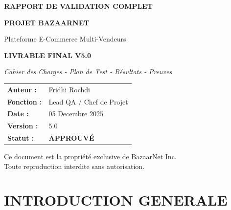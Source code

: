 \documentclass[12pt,a4paper]{article}
\begin{document}

\begin{titlepage}
    \begin{center}
        \vspace*{2cm}
        \Huge
        \textbf{RAPPORT DE VALIDATION COMPLET}
        
        \vspace{1cm}
        \LARGE
        \textbf{PROJET BAZAARNET}
        
        \vspace{0.5cm}
        \Large
        Plateforme E-Commerce Multi-Vendeurs
        
        \vspace{3cm}
        \textbf{LIVRABLE FINAL V5.0}
        
        \vspace{1cm}
        \textit{Cahier des Charges - Plan de Test - Résultats - Preuves}
        
        \vspace{4cm}
        \begin{tabular}{ll}
            \textbf{Auteur :} & Fridhi Rochdi \\
            \textbf{Fonction :} & Lead QA / Chef de Projet \\
            \textbf{Date :} & 05 Decembre 2025 \\
            \textbf{Version :} & 5.0 \\
            \textbf{Statut :} & \textbf{APPROUVÉ} \\
        \end{tabular}
        
        \vfill
        \small
        Ce document est la propriété exclusive de BazaarNet Inc.\\
        Toute reproduction interdite sans autorisation.
    \end{center}
\end{titlepage}

\newpage

\tableofcontents
\newpage

\section{INTRODUCTION GENERALE}
\end{document}
